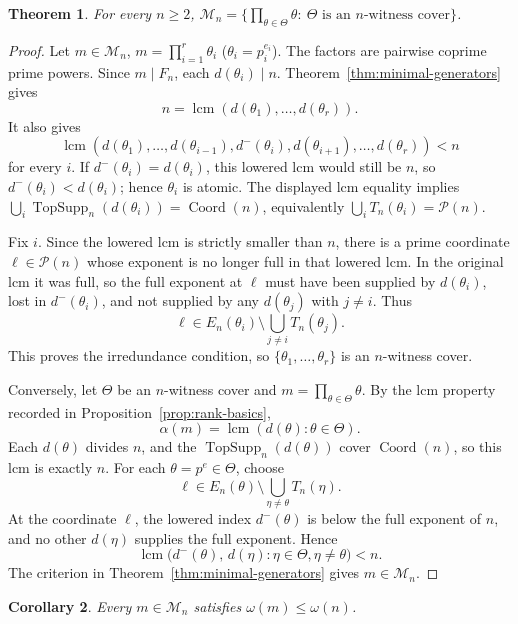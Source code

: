 \documentclass[11pt,letterpaper]{article}
\numberwithin{equation}{section}
\theoremstyle{plain}
\newtheorem{theorem}{Theorem}[section]
\newtheorem{corollary}[theorem]{Corollary}
\theoremstyle{definition}
\theoremstyle{remark}
\DeclareMathOperator{\lcmop}{lcm}
\DeclareMathOperator{\Coord}{Coord}
\DeclareMathOperator{\TopSupp}{TopSupp}
\begin{document}
\begin{theorem}\label{thm:witness-classification}
For every $n\ge 2$,
$\mathcal M_n=\bigl\{\prod_{\theta\in\Theta}\theta:\
\Theta\text{ is an $n$-witness cover}\bigr\}$.
\end{theorem}

\begin{proof}
Let $m\in\mathcal M_n$, $m=\prod_{i=1}^r\theta_i$ ($\theta_i=p_i^{e_i}$).
The factors are pairwise coprime prime powers. Since \(m\mid F_n\), each
\(d(\theta_i)\mid n\). Theorem~\ref{thm:minimal-generators} gives
\[
n=\lcmop(d(\theta_1),\ldots,d(\theta_r)).
\]
It also gives
\[
\lcmop(d(\theta_1),\ldots,d(\theta_{i-1}),d^-(\theta_i),
d(\theta_{i+1}),\ldots,d(\theta_r))<n
\]
for every \(i\). If \(d^-(\theta_i)=d(\theta_i)\), this lowered lcm would still
be \(n\), so \(d^-(\theta_i)<d(\theta_i)\); hence \(\theta_i\) is atomic.
The displayed lcm equality implies
\(\bigcup_i\TopSupp_n(d(\theta_i))=\Coord(n)\), equivalently
\(\bigcup_iT_n(\theta_i)=\mathcal P(n)\).

Fix \(i\). Since the lowered lcm is strictly smaller than \(n\), there is a
prime coordinate \(\ell\in\mathcal P(n)\) whose exponent is no longer full in
that lowered lcm. In the original lcm it was full, so the full exponent at
\(\ell\) must have been supplied by \(d(\theta_i)\), lost in
\(d^-(\theta_i)\), and not supplied by any \(d(\theta_j)\) with \(j\ne i\).
Thus
\[
\ell\in E_n(\theta_i)\setminus\bigcup_{j\ne i}T_n(\theta_j).
\]
This proves the irredundance condition, so
\(\{\theta_1,\ldots,\theta_r\}\) is an \(n\)-witness cover.

Conversely, let $\Theta$ be an $n$-witness cover and
$m=\prod_{\theta\in\Theta}\theta$. By
the lcm property recorded in Proposition~\ref{prop:rank-basics},
\[
\alpha(m)=\lcmop(d(\theta):\theta\in\Theta).
\]
Each \(d(\theta)\) divides \(n\), and the \(\TopSupp_n(d(\theta))\) cover
\(\Coord(n)\), so this lcm is exactly \(n\). For each
\(\theta=p^e\in\Theta\), choose
\[
\ell\in E_n(\theta)\setminus\bigcup_{\eta\neq\theta}T_n(\eta).
\]
At the coordinate \(\ell\), the lowered index \(d^-(\theta)\) is below the full
exponent of \(n\), and no other \(d(\eta)\) supplies the full exponent. Hence
\[
\lcmop\bigl(d^-(\theta),\,d(\eta):\eta\in\Theta,\eta\ne\theta\bigr)<n.
\]
The criterion in Theorem~\ref{thm:minimal-generators} gives
\(m\in\mathcal M_n\).
\end{proof}

\begin{corollary}\label{cor:support-bound}
Every $m\in\mathcal M_n$ satisfies $\omega(m)\le\omega(n)$.
\end{corollary}
\end{document}
